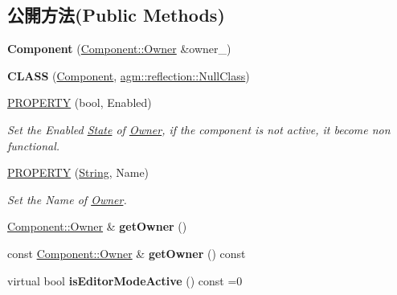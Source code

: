 \subsection*{公開方法(Public Methods)}
\begin{DoxyCompactItemize}
\item 
{\bfseries Component} (\hyperlink{class_i_dream_sky_1_1_component_1_1_owner}{Component\+::\+Owner} \&owner\+\_\+)\hypertarget{class_i_dream_sky_1_1_component_a756ac15f5ce6fa021d35c6115b8fe64b}{}\label{class_i_dream_sky_1_1_component_a756ac15f5ce6fa021d35c6115b8fe64b}

\item 
{\bfseries C\+L\+A\+SS} (\hyperlink{class_i_dream_sky_1_1_component}{Component}, \hyperlink{classagm_1_1reflection_1_1_null_class}{agm\+::reflection\+::\+Null\+Class})\hypertarget{class_i_dream_sky_1_1_component_a2fb71f3f47432cbcd28db0a183833686}{}\label{class_i_dream_sky_1_1_component_a2fb71f3f47432cbcd28db0a183833686}

\item 
\hyperlink{class_i_dream_sky_1_1_component_a6b70d4bbc1cc834bf94fce513af81424}{P\+R\+O\+P\+E\+R\+TY} (bool, Enabled)
\begin{DoxyCompactList}\small\item\em Set the Enabled \hyperlink{class_i_dream_sky_1_1_state}{State} of \hyperlink{class_i_dream_sky_1_1_component_1_1_owner}{Owner}, if the component is not active, it become non functional. \end{DoxyCompactList}\item 
\hyperlink{class_i_dream_sky_1_1_component_a938ae1e7fbc0288b07c89cccada70046}{P\+R\+O\+P\+E\+R\+TY} (\hyperlink{class_i_dream_sky_1_1_string}{String}, Name)
\begin{DoxyCompactList}\small\item\em Set the Name of \hyperlink{class_i_dream_sky_1_1_component_1_1_owner}{Owner}. \end{DoxyCompactList}\item 
\hyperlink{class_i_dream_sky_1_1_component_1_1_owner}{Component\+::\+Owner} \& {\bfseries get\+Owner} ()\hypertarget{class_i_dream_sky_1_1_component_a296debc61f8cccc361ef8db6debcb5c8}{}\label{class_i_dream_sky_1_1_component_a296debc61f8cccc361ef8db6debcb5c8}

\item 
const \hyperlink{class_i_dream_sky_1_1_component_1_1_owner}{Component\+::\+Owner} \& {\bfseries get\+Owner} () const \hypertarget{class_i_dream_sky_1_1_component_aa736314b74d00201729f97bb40c0f7dc}{}\label{class_i_dream_sky_1_1_component_aa736314b74d00201729f97bb40c0f7dc}

\item 
virtual bool {\bfseries is\+Editor\+Mode\+Active} () const  =0\hypertarget{class_i_dream_sky_1_1_component_a364ed78577cefce64cea058e31343aa0}{}\label{class_i_dream_sky_1_1_component_a364ed78577cefce64cea058e31343aa0}

\end{DoxyCompactItemize}
